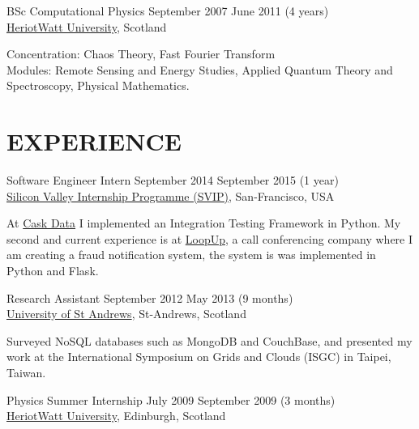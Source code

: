 \documentclass[line,margin]{cv}
\begin{document}
\begin{resume}
BSc Computational Physics
\hfill September 2007 \textemdash{} June 2011 (4 years) \\
\href{http://www.hw.ac.uk}{Heriot­Watt University}, Scotland

\vspace{0.1em}
\begin{adjustwidth}{2.0em}{2.0em}
	Concentration: Chaos Theory, Fast Fourier Transform \\
	Modules: Remote Sensing and Energy Studies, Applied Quantum Theory and Spectroscopy,
	Physical Mathematics.
\end{adjustwidth}



\section{EXPERIENCE}

Software Engineer Intern
\hfill September 2014 \textemdash{} September 2015 (1 year) \\
\href{http://www.siliconvalleyinternship.com/}
{Silicon Valley Internship Programme (SVIP)}, San-Francisco, USA

\vspace{0.1em}
\begin{adjustwidth}{2.0em}{2.0em}
    At \href{http://cask.io}{Cask Data} I implemented an Integration Testing 
    Framework in Python. My second and current experience is at 
    \href{http://loopup.com}{LoopUp}, a call conferencing
    company where I am creating a fraud notification system, the system is
    was implemented in Python and Flask.
\end{adjustwidth}


Research Assistant
\hfill September 2012 \textemdash{}  May 2013 (9 months) \\
\href{http://www.st-andrews.ac.uk}{University of St Andrews}, St-Andrews, Scotland

\vspace{0.1em}
\begin{adjustwidth}{2.0em}{2.0em}
    Surveyed NoSQL databases such as MongoDB and CouchBase, and presented 
    my work at the International Symposium on Grids and Clouds (ISGC) 
    in Taipei, Taiwan.
\end{adjustwidth}


Physics Summer Internship
\hfill July 2009 \textemdash{} September 2009 (3 months) \\
\href{http://www.hw.ac.uk}{Heriot­Watt University}, Edinburgh, Scotland


\end{resume}
\end{document}
